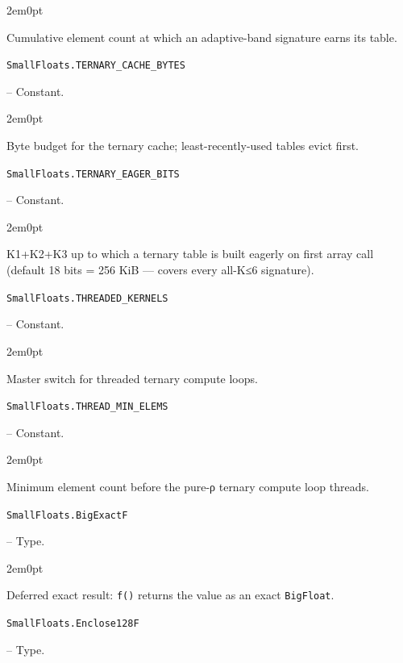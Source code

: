 \begin{adjustwidth}{2em}{0pt}

Cumulative element count at which an adaptive-band signature earns its table.



\end{adjustwidth}
\hypertarget{7367898474622902585}{\texttt{SmallFloats.TERNARY\_CACHE\_BYTES}}  -- {Constant.}

\begin{adjustwidth}{2em}{0pt}

Byte budget for the ternary cache; least-recently-used tables evict first.



\end{adjustwidth}
\hypertarget{13776331714046560855}{\texttt{SmallFloats.TERNARY\_EAGER\_BITS}}  -- {Constant.}

\begin{adjustwidth}{2em}{0pt}

K1+K2+K3 up to which a ternary table is built eagerly on first array call (default 18 bits = 256 KiB — covers every all-K≤6 signature).



\end{adjustwidth}
\hypertarget{16271046097526486057}{\texttt{SmallFloats.THREADED\_KERNELS}}  -- {Constant.}

\begin{adjustwidth}{2em}{0pt}

Master switch for threaded ternary compute loops.



\end{adjustwidth}
\hypertarget{8230965136284310108}{\texttt{SmallFloats.THREAD\_MIN\_ELEMS}}  -- {Constant.}

\begin{adjustwidth}{2em}{0pt}

Minimum element count before the pure-ρ ternary compute loop threads.



\end{adjustwidth}
\hypertarget{8770213630193056212}{\texttt{SmallFloats.BigExactF}}  -- {Type.}

\begin{adjustwidth}{2em}{0pt}

Deferred exact result: \texttt{f()} returns the value as an exact \texttt{BigFloat}.



\end{adjustwidth}
\hypertarget{12947903703664656909}{\texttt{SmallFloats.Enclose128F}}  -- {Type.}

